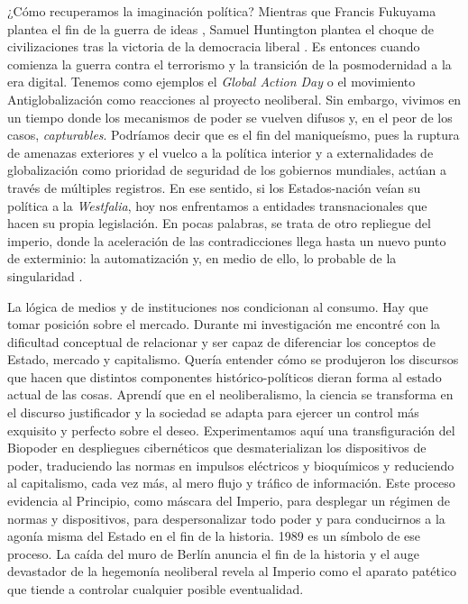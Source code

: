 ¿Cómo recuperamos la imaginación política? Mientras que Francis Fukuyama plantea el fin de la guerra de ideas \autocite{fukuyamaFinHistoriaUltimo1992}, Samuel Huntington plantea el choque de civilizaciones tras la victoria de la democracia liberal \autocite{huntingtonClashCivilizationsRemaking1996}. Es entonces cuando comienza la guerra contra el terrorismo y la transición de la posmodernidad a la era digital. Tenemos como ejemplos el \emph{Global Action Day} o el movimiento Antiglobalización como reacciones al proyecto neoliberal. Sin embargo, vivimos en un tiempo donde los mecanismos de poder se vuelven difusos y, en el peor de los casos, \emph{capturables}. Podríamos decir que es el fin del maniqueísmo, pues la ruptura de amenazas exteriores y el vuelco a la política interior y a externalidades de globalización como prioridad de seguridad de los gobiernos mundiales, actúan a través de múltiples registros. En ese sentido, si los Estados-nación veían su política a la \emph{Westfalia}, hoy nos enfrentamos a entidades transnacionales que hacen su propia legislación. En pocas palabras, se trata de otro repliegue del imperio, donde la aceleración de las contradicciones llega hasta un nuevo punto de exterminio: la automatización y, en medio de ello, lo probable de la singularidad \autocite{fraseFourFutures2011,fraseFourFuturesVisions2016}.

La lógica de medios y de instituciones nos condicionan al consumo. Hay que tomar posición sobre el mercado. Durante mi investigación me encontré con la dificultad conceptual de relacionar y ser capaz de diferenciar los conceptos de Estado, mercado y capitalismo. Quería entender cómo se produjeron los discursos que hacen que distintos componentes histórico-políticos dieran forma al estado actual de las cosas. Aprendí que en el neoliberalismo, la ciencia se transforma en el discurso justificador y la sociedad se adapta para ejercer un control más exquisito y perfecto sobre el deseo. Experimentamos aquí una transfiguración del Biopoder en despliegues cibernéticos que desmaterializan los dispositivos de poder, traduciendo las normas en impulsos eléctricos y bioquímicos y reduciendo al capitalismo, cada vez más, al mero flujo y tráfico de información. Este proceso evidencia al Principio, como máscara del Imperio, para desplegar un régimen de normas y dispositivos, para despersonalizar todo poder y para conducirnos a la agonía misma del Estado en el fin de la historia. 1989 es un símbolo de ese proceso. La caída del muro de Berlín anuncia el fin de la historia y el auge devastador de la hegemonía neoliberal revela al Imperio como el aparato patético que tiende a controlar cualquier posible eventualidad.

